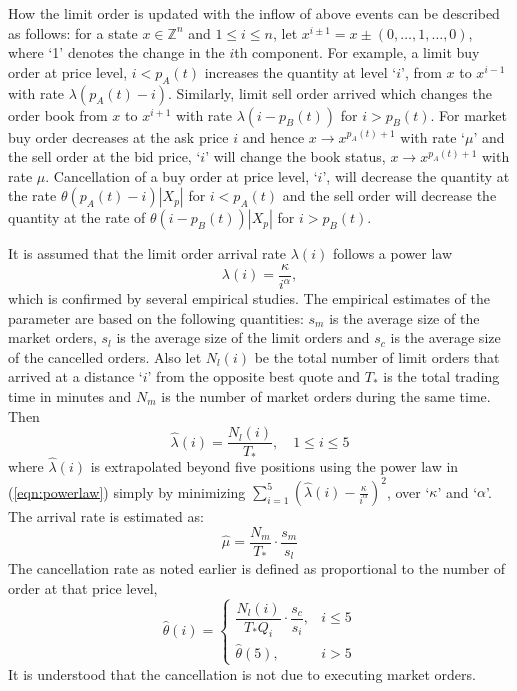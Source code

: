 How the limit order is updated with the inflow of above events can be described as follows: for a state $x \in \mathbb{Z}^n$ and $1 \leq i \leq n$, let $x^{i \pm 1}=x \pm (0,\ldots,1,\ldots,0)$, where `1' denotes the change in the $i$th component. For example, a limit buy order at price level, $i<p_A(t)$ increases the quantity at level `$i$', from $x$ to $x^{i-1}$ with rate $\lambda(p_A(t)-i)$. Similarly, limit sell order arrived which changes the order book from $x$ to $x^{i+1}$ with rate $\lambda(i-p_B(t))$ for $i>p_B(t)$. For market buy order decreases at the ask price $i$ and hence $x \to x^{p_A(t)+1}$ with rate `$\mu$' and the sell order at the bid price, `$i$' will change the book status, $x \to x^{p_A(t)+1}$ with rate $\mu$. Cancellation of a buy order at price level, `$i$', will decrease the quantity at the rate $\theta(p_A(t)-i)|X_p|$ for $i<p_A(t)$ and the sell order will decrease the quantity at the rate of $\theta(i-p_B(t))|X_p|$ for $i>p_B(t)$.


It is assumed that the limit order arrival rate $\lambda(i)$ follows a power law
	\begin{equation}\label{eqn:powerlaw}
	\lambda(i)=\dfrac{\kappa}{i^\alpha},
	\end{equation}
which is confirmed by several empirical studies. The empirical estimates of the parameter are based on the following quantities: $s_m$ is the average size of the market orders, $s_l$ is the average size of the limit orders and $s_c$ is the average size of the cancelled orders. Also let $N_l(i)$ be the total number of limit orders that arrived at a distance `$i$' from the opposite best quote and $T_*$ is the total trading time in minutes and $N_m$ is the number of market orders during the same time. Then 
	\begin{equation}\label{eqn:hatlambdant}
	\hat{\lambda}(i)= \dfrac{N_l(i)}{T_*}, \quad 1 \leq i \leq 5
	\end{equation}
where $\hat{\lambda}(i)$ is extrapolated beyond five positions using the power law in (\ref{eqn:powerlaw}) simply by minimizing $\sum_{i=1}^5 (\hat{\lambda}(i)- \frac{\kappa}{i^\alpha})^2$, over `$\kappa$' and `$\alpha$'. The arrival rate is estimated as:
	\begin{equation}\label{eqn:hatnmt}
	\hat{\mu}=\dfrac{N_m}{T_*} \cdot \dfrac{s_m}{s_l}
	\end{equation}
The cancellation rate as noted earlier is defined as proportional to the number of order at that price level,
	\begin{equation}\label{eqn:hatthetacase}
	\hat{\theta}(i)=
	\begin{cases}
	\dfrac{N_l(i)}{T_*Q_i} \cdot \dfrac{s_c}{s_i}, & i \leq 5 \\
	\hat{\theta}(5), & i>5
	\end{cases}
	\end{equation}
It is understood that the cancellation is not due to executing market orders.


